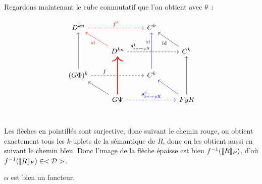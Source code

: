 \begin{pv}
    Regardons maintenant le cube commutatif que l'on obtient avec $\theta$~:

    \[\begin{tikzcd}
        D^{kn}\arrow[rr, dashed, red, "f^k"] & &
            C^k & \\
        & D^{kn}\arrow[ul, red, "\id"]
                \arrow[rr, near start, dashed, "\theta_{k\ast\rightarrow yR}^1"] & &
            C^k\arrow[ul, "\id"] \\
        (G\Phi)^k\arrow[uu]\arrow[rr, near start, dashed, "f"] & &
            C^k\arrow[uu, near end, blue, "\id"] & \\
        & G\Psi\arrow[ul]\arrow[uu, red, very thick]
               \arrow[rr, dashed, blue, "\theta_{k\ast\rightarrow yR}^2"] & &
            FyR\arrow[uu]\arrow[ul, blue] \\
    \end{tikzcd}\]

    Les flèches en pointillés sont surjective, donc suivant le chemin rouge, on obtient
    exactement tous les $k$-uplets de la sémantique de $R$, donc on les obtient aussi
    en suivant le chemin bleu. Donc l'image de la flèche épaisse est bien
    $f^{-1}(\llbracket {R} \rrbracket_F)$, d'où $f^{-1}(\llbracket {R} \rrbracket_F)\in<\mathcal{D}>$.
\end{pv}

\begin{prop}
    $\alpha$ est bien un foncteur.
\end{prop}

